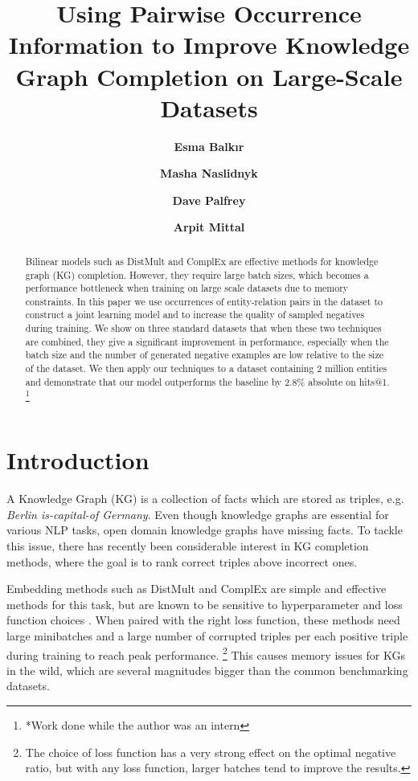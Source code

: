 \documentclass[11pt,a4paper, dvipsnames]{article}
\title{Using Pairwise Occurrence Information to Improve Knowledge Graph Completion on Large-Scale Datasets}
\author[1,2*]{\textbf{Esma Balk{\i}r}}
\author[2]{\textbf{Masha Naslidnyk}}
\author[2]{\textbf{Dave Palfrey}}
\author[2]{\textbf{Arpit Mittal}}
\affil[1]{University of Edinburgh, Scotland, UK}
\affil[2]{Amazon Research, Cambridge, UK}
\affil[1]{\tt esma.balkir@ed.ac.uk}
\affil[2]{\tt \{naslidny, dpalfrey, mitarpit\}@amazon.co.uk}
\date{}
\newcommand\blfootnote[1]{\begingroup
  \renewcommand\thefootnote{}\footnote{#1}\addtocounter{footnote}{-1}\endgroup
}
\begin{document}
\maketitle

\begin{abstract}
Bilinear models such as DistMult and \linebreak ComplEx are effective methods for knowledge graph (KG) completion. However, they require large batch sizes, which becomes a performance bottleneck when training on large scale datasets due to memory constraints. 
In this paper we use occurrences of entity-relation pairs in the dataset to construct a joint learning model and to increase the quality of sampled negatives during training. We show on three standard datasets that when these two techniques are combined, they give a significant improvement in performance, especially when the batch size and the number of generated negative examples are low relative to the size of the dataset. We then apply our techniques to a dataset containing 2 million entities and demonstrate that our model outperforms the baseline by 2.8\% absolute on hits@1.
\blfootnote{*Work done while the author was an intern}
\end{abstract}

\section{Introduction}

A Knowledge Graph (KG) is a collection of facts which are stored as triples, e.g. \textit{Berlin is-capital-of Germany}.
Even though knowledge graphs are essential for various NLP tasks, open domain knowledge graphs have missing facts. To tackle this issue, there has recently been considerable interest in KG completion methods, where the goal is to rank correct triples above incorrect ones. 

Embedding methods such as 
DistMult \cite{Yang2014EmbeddingBases} and 
ComplEx \cite{Trouillon2016ComplexPrediction} are simple and effective methods for this task, but are known to be sensitive to  hyperparameter and loss function choices \citep{Kadlec2017KnowledgeBack, Lacroix2018CanonicalCompletion}.
When paired with the right loss function, these methods need large minibatches and a large number of corrupted triples per each positive triple during training to reach peak performance. \footnote{The choice of loss function has a very strong effect on the optimal negative ratio, but with any loss function, larger batches tend to improve the results.} This causes memory issues for KGs in the wild, which are several magnitudes bigger than the common benchmarking datasets. 
\end{document}
